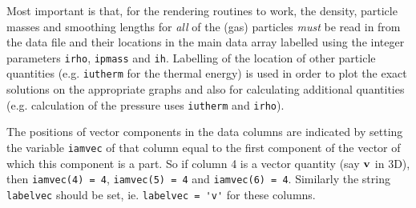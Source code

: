 \documentclass[a4paper,11pt]{article}
\begin{document}
Most important is that, for the rendering routines to work, the density, particle
masses and smoothing lengths for \emph{all} of the (gas) particles \emph{must} be read in from
the data file and their locations in the main data array labelled using the integer
parameters \verb+irho+, \verb+ipmass+ and \verb+ih+. Labelling of the location of other particle
quantities (e.g. \verb+iutherm+ for the thermal energy) is used in
order to plot the exact solutions on the appropriate graphs and also for calculating
additional quantities (e.g. calculation of the pressure uses \verb+iutherm+ and
\verb+irho+).

 The positions of vector components in the data columns are indicated by setting the variable \verb+iamvec+ of that
column equal to the first component of the vector of which this component is a part. So if column 4
is a vector quantity (say ${\bf v}$ in 3D), then \verb+iamvec(4) = 4+, \verb+iamvec(5) = 4+ and
\verb+iamvec(6) = 4+. Similarly the string \verb+labelvec+ should be set, ie. \verb+labelvec = 'v'+ for these columns.



\end{document}
